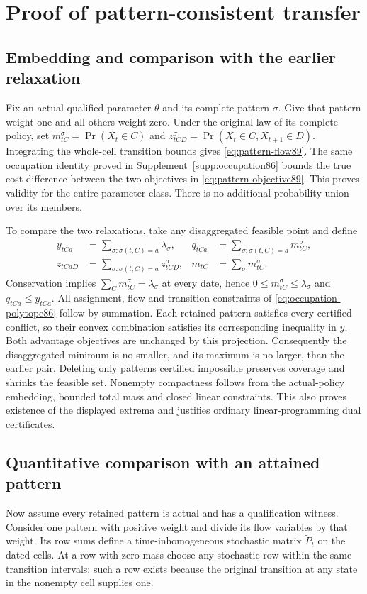 \section{Proof of pattern-consistent transfer}\label{supp:pattern89}
\subsection{Embedding and comparison with the earlier relaxation}
Fix an actual qualified parameter $\theta$ and its complete pattern $\sigma$. Give that pattern weight one and all others weight zero. Under the original law of its complete policy, set $m^\sigma_{tC}=\Pr(X_t\in C)$ and $z^\sigma_{tCD}=\Pr(X_t\in C,X_{t+1}\in D)$. Integrating the whole-cell transition bounds gives \eqref{eq:pattern-flow89}. The same occupation identity proved in Supplement~\ref{supp:occupation86} bounds the true cost difference between the two objectives in \eqref{eq:pattern-objective89}. This proves validity for the entire parameter class. There is no additional probability union over its members.

To compare the two relaxations, take any disaggregated feasible point and define
\begin{align*}
 y_{tCa}&=\sum_{\sigma:\sigma(t,C)=a}\lambda_\sigma,&
 q_{tCa}&=\sum_{\sigma:\sigma(t,C)=a}m^\sigma_{tC},\\
 z_{tCaD}&=\sum_{\sigma:\sigma(t,C)=a}z^\sigma_{tCD},&
 m_{tC}&=\sum_\sigma m^\sigma_{tC}.
\end{align*}
Conservation implies $\sum_Cm^\sigma_{tC}=\lambda_\sigma$ at every date, hence $0\le m^\sigma_{tC}\le\lambda_\sigma$ and $q_{tCa}\le y_{tCa}$. All assignment, flow and transition constraints of \eqref{eq:occupation-polytope86} follow by summation. Each retained pattern satisfies every certified conflict, so their convex combination satisfies its corresponding inequality in $y$. Both advantage objectives are unchanged by this projection. Consequently the disaggregated minimum is no smaller, and its maximum is no larger, than the earlier pair. Deleting only patterns certified impossible preserves coverage and shrinks the feasible set. Nonempty compactness follows from the actual-policy embedding, bounded total mass and closed linear constraints. This also proves existence of the displayed extrema and justifies ordinary linear-programming dual certificates.

\subsection{Quantitative comparison with an attained pattern}
Now assume every retained pattern is actual and has a qualification witness. Consider one pattern with positive weight and divide its flow variables by that weight. Its row sums define a time-inhomogeneous stochastic matrix $\widetilde P_t$ on the dated cells. At a row with zero mass choose any stochastic row within the same transition intervals; such a row exists because the original transition at any state in the nonempty cell supplies one.

